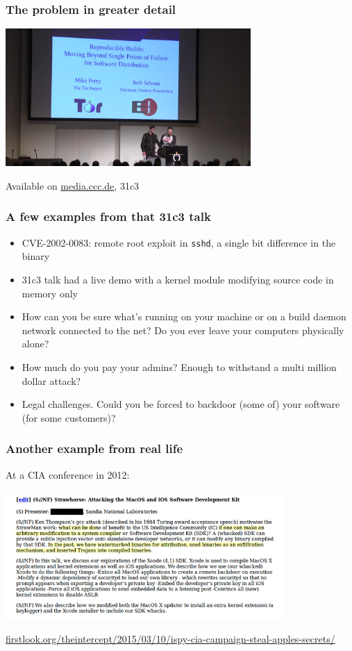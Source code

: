 \documentclass[14pt]{beamer}
\begin{document}
\begin{frame}
 \frametitle{The problem in greater detail}

 \begin{center}
  \includegraphics[width=0.7\textwidth]{images/31c3.png}

  Available on \url{media.ccc.de}, 31c3
 \end{center}
\end{frame}

\begin{frame}[fragile]
 \frametitle{A few examples from that 31c3 talk}
 \begin{itemize}
  \item CVE-2002-0083: remote root exploit in \texttt{sshd}, a single bit difference in the binary
  \item<2-5> 31c3 talk had a live demo with a kernel module modifying source code in memory only
  \item<3-5> How can you be sure what's running on your machine or on a build
  daemon network connected to the net? Do you ever leave your computers
  physically alone? 
  \item<4-5> How much do you pay your admins? Enough to withstand a multi million
  dollar attack?
  \item<5> Legal challenges. Could you be forced to backdoor (some of) your
  software (for some customers)?
 \end{itemize}
\end{frame}

\begin{frame}[fragile]
 \frametitle{Another example from real life}

 At a CIA conference in 2012:
 \begin{center}
  \includegraphics[width=0.8\textwidth]{images/strawhorse.png}

  {\footnotesize
  \url{firstlook.org/theintercept/2015/03/10/ispy-cia-campaign-steal-apples-secrets/}
  }
 \end{center}
\end{frame}
\end{document}
